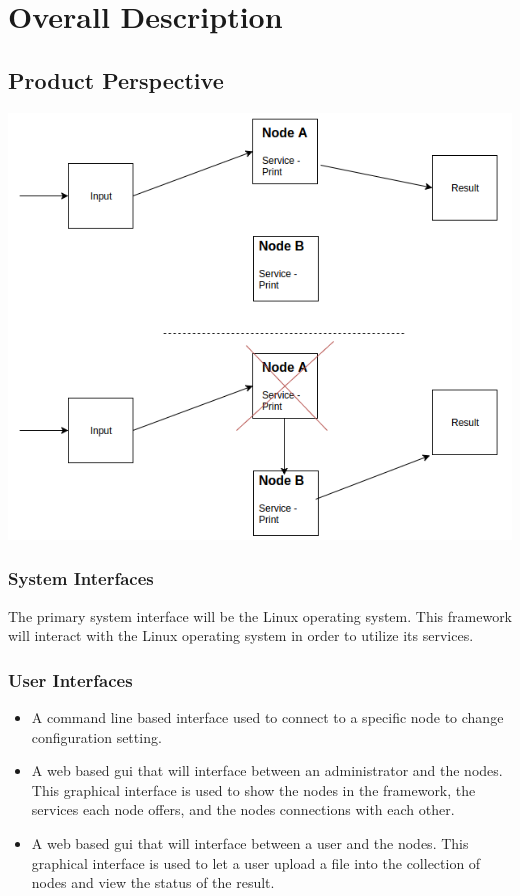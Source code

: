 \documentclass[draftclsnofoot, onecolumn, compsoc, 10pt]{IEEEtran}
\begin{document}
\section{Overall Description}
\subsection{Product Perspective}
{\centering\includegraphics[scale=0.4]{img_1}}

\subsubsection{System Interfaces}
The primary system interface will be the Linux operating system. This framework will interact with the Linux operating system in order to utilize its services.

\subsubsection{User Interfaces}
\begin{itemize}
\item A command line based interface used to connect to a specific node to change configuration setting. \\ 
\item A web based gui that will interface between an administrator and the nodes. This graphical interface is used to show the nodes in the framework, the services each node offers, and the nodes connections with each other.\\ 
\item A web based gui that will interface between a user and the nodes. This graphical interface is used to let a user upload a file into the collection of nodes and view the status of the result.
\end{itemize}
\end{document}
